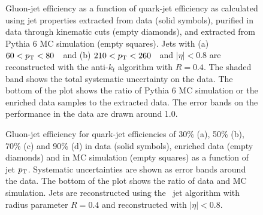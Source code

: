 \begin{figure}[!htp]
\begin{center}
\caption{ Gluon-jet efficiency as a function of quark-jet efficiency as calculated using jet properties extracted
from data (solid symbols), purified in data through kinematic cuts (empty diamonds), and extracted from
{\sc Pythia} 6 MC simulation (empty squares).
Jets with (a) $60<p_{\text{T}}<80$~\GeV\ and (b) $210<p_{\text{T}}<260$~\GeV\ and $|\eta|<0.8$ are reconstructed with the anti-$k_t$ algorithm with $R=0.4$. 
The shaded band shows the total systematic uncertainty on the data. 
The bottom of the plot
shows the ratio of {\sc Pythia} 6 MC simulation or the enriched data samples 
to the extracted data. The error bands on the performance
in the data are drawn around 1.0. 
}
\label{fig:jet-reconstruction:qg:perf_summary_pur}
\end{center}
\end{figure}



\begin{figure}[htbp]
\begin{center}
\caption{
Gluon-jet efficiency for quark-jet efficiencies of 30\% (a), 50\% (b), 70\% (c) and 90\% (d) 
in data (solid symbols), enriched data (empty diamonds) and in \Pythia MC simulation 
(empty squares) as a function of jet $p_{\text{T}}$. 
Systematic uncertainties are shown as error bands around the data. The bottom of the plot 
shows the ratio of data and MC simulation. 
Jets are reconstructed using the \AKT\ jet algorithm with radius parameter 
$R=0.4$ and reconstructed with $|\eta|<0.8$.
}
\label{fig:jet-reconstruction:qg:perfDataMC}
\end{center}
\end{figure}


